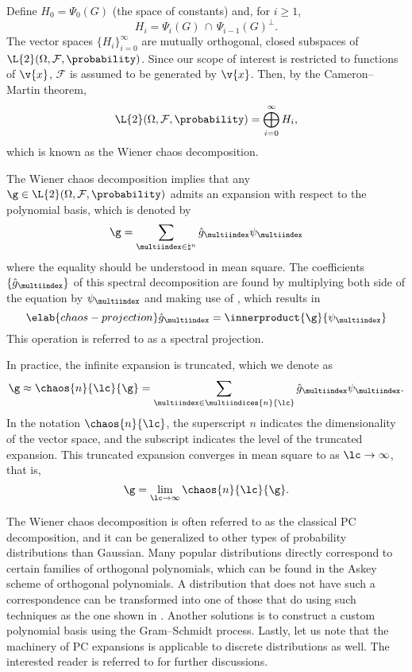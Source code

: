 Define $H_0 = \Psi_0(G)$ (the space of constants) and, for $i \geq 1$,
\[
  H_i = \Psi_i(G) \, \cap \, \Psi_{i - 1}(G)^\perp.
\]
The vector spaces $\{ H_i \}_{i = 0}^\infty$ are mutually orthogonal, closed
subspaces of $\L{2}(\Omega, \mathcal{F}, \probability)$. Since our scope of
interest is restricted to functions of $\v{x}$, $\mathcal{F}$ is assumed to be
generated by $\v{x}$. Then, by the Cameron--Martin theorem,
\[
  \L{2}(\Omega, \mathcal{F}, \probability) = \bigoplus_{i = 0}^\infty H_i,
\]
which is known as the Wiener chaos decomposition.

The Wiener chaos decomposition implies that any $\g \in \L{2}(\Omega,
\mathcal{F}, \probability)$ admits an expansion with respect to the polynomial
basis, which is denoted by
\[
  \g = \sum_{\multiindex \in \natural^n} \hat{g}_{\multiindex} \psi_{\multiindex}
\]
where the equality should be understood in mean square. The coefficients $\{
\hat{g}_{\multiindex} \}$ of this spectral decomposition are found by
multiplying both side of the equation by $\psi_{\multiindex}$ and making use of
, which results in
\begin{equation} \elab{chaos-projection}
  \hat{g}_{\multiindex} = \innerproduct{\g}{\psi_{\multiindex}}
\end{equation}
This operation is referred to as a spectral projection.

In practice, the infinite expansion is truncated, which we denote as
\[
  \g \approx \chaos{n}{\lc}{\g} = \sum_{\multiindex \in \multiindices{n}{\lc}} \hat{g}_{\multiindex} \psi_{\multiindex}.
\]
In the notation $\chaos{n}{\lc}$, the superscript $n$ indicates the
dimensionality of the vector space, and the subscript \lc indicates the level of
the truncated expansion. This truncated expansion converges in mean square to \g
as $\lc \to \infty$, that is,
\[
  \g = \lim_{\lc \to \infty} \chaos{n}{\lc}{\g}.
\]

The Wiener chaos decomposition is often referred to as the classical \acf{PC}
decomposition, and it can be generalized to other types of probability
distributions than Gaussian. Many popular distributions directly correspond to
certain families of orthogonal polynomials, which can be found in the Askey
scheme of orthogonal polynomials. A distribution that does not have such a
correspondence can be transformed into one of those that do using such
techniques as the one shown in . Another
solutions is to construct a custom polynomial basis using the Gram--Schmidt
process. Lastly, let us note that the machinery of \ac{PC} expansions is
applicable to discrete distributions as well. The interested reader is referred
to \cite{xiu2010} for further discussions.
